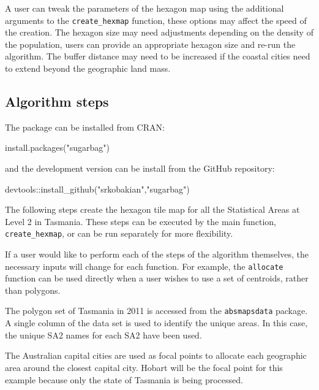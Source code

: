 A user can tweak the parameters of the hexagon map using the additional
arguments to the \texttt{create\_hexmap} function, these options may
affect the speed of the creation. The hexagon size may need adjustments
depending on the density of the population, users can provide an
appropriate hexagon size and re-run the algorithm. The buffer distance
may need to be increased if the coastal cities need to extend beyond the
geographic land mass.

\hypertarget{algorithm-steps}{%
\subsection{Algorithm steps}\label{algorithm-steps}}

The package can be installed from CRAN:

\begin{Schunk}
\begin{Sinput}
install.packages("sugarbag")
\end{Sinput}
\end{Schunk}

and the development version can be install from the GitHub repository:

\begin{Schunk}
\begin{Sinput}
devtools::install_github("srkobakian","sugarbag")
\end{Sinput}
\end{Schunk}

The following steps create the hexagon tile map for all the Statistical
Areas at Level 2 in Tasmania. These steps can be executed by the main
function, \texttt{create\_hexmap}, or can be run separately for more
flexibility.

If a user would like to perform each of the steps of the algorithm
themselves, the necessary inputs will change for each function. For
example, the \texttt{allocate} function can be used directly when a user
wishes to use a set of centroids, rather than polygons.

The polygon set of Tasmania in 2011 is accessed from the
\texttt{absmapsdata} package. A single column of the data set is used to
identify the unique areas. In this case, the unique SA2 names for each
SA2 have been used.

The Australian capital cities are used as focal points to allocate each
geographic area around the closest capital city. Hobart will be the
focal point for this example because only the state of Tasmania is being
processed.


